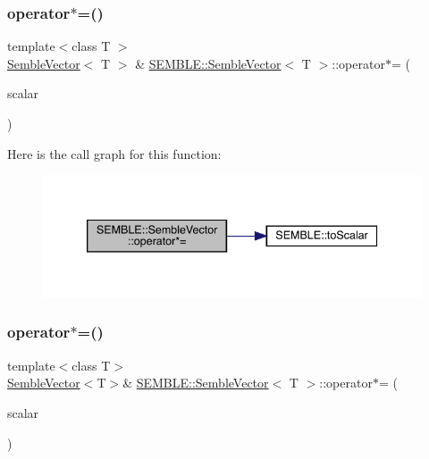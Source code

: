 \mbox{\label{structSEMBLE_1_1SembleVector_a2a10bc502e9dc2f06e670dcb4eb3ac05}} 
\subsubsection{\texorpdfstring{operator$\ast$=()}{operator*=()}\hspace{0.1cm}{\footnotesize\ttfamily [3/6]}}
{\footnotesize\ttfamily template$<$class T $>$ \\
\mbox{\hyperlink{structSEMBLE_1_1SembleVector}{Semble\+Vector}}$<$ T $>$ \& \mbox{\hyperlink{structSEMBLE_1_1SembleVector}{S\+E\+M\+B\+L\+E\+::\+Semble\+Vector}}$<$ T $>$\+::operator$\ast$= (\begin{DoxyParamCaption}\item[{const typename \mbox{\hyperlink{structSEMBLE_1_1PromoteScalar}{Promote\+Scalar}}$<$ T $>$\+::Type \&}]{scalar }\end{DoxyParamCaption})}

Here is the call graph for this function\+:
\nopagebreak
\begin{figure}[H]
\begin{center}
\leavevmode
\includegraphics[width=339pt]{d9/d94/structSEMBLE_1_1SembleVector_a2a10bc502e9dc2f06e670dcb4eb3ac05_cgraph}
\end{center}
\end{figure}
\mbox{\label{structSEMBLE_1_1SembleVector_adcb53ca0c494cd2604ec9bec9e95f74a}} 
\subsubsection{\texorpdfstring{operator$\ast$=()}{operator*=()}\hspace{0.1cm}{\footnotesize\ttfamily [4/6]}}
{\footnotesize\ttfamily template$<$class T$>$ \\
\mbox{\hyperlink{structSEMBLE_1_1SembleVector}{Semble\+Vector}}$<$T$>$\& \mbox{\hyperlink{structSEMBLE_1_1SembleVector}{S\+E\+M\+B\+L\+E\+::\+Semble\+Vector}}$<$ T $>$\+::operator$\ast$= (\begin{DoxyParamCaption}\item[{const typename \mbox{\hyperlink{structSEMBLE_1_1PromoteScalar}{Promote\+Scalar}}$<$ T $>$\+::Type \&}]{scalar }\end{DoxyParamCaption})}

